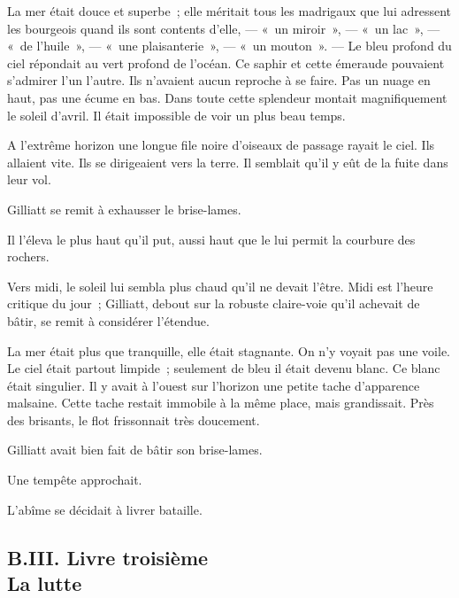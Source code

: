 \documentclass[french,twoside]{book} %
\begin{document}
La mer était douce et superbe ; elle méritait tous les madrigaux que lui adressent les bourgeois quand ils sont contents d’elle, — « un miroir », — « un lac », — « de l’huile », — « une plaisanterie », — « un mouton ». — Le bleu profond du ciel répondait au vert profond de l’océan. Ce saphir et cette émeraude pouvaient s’admirer l’un l’autre. Ils n’avaient aucun reproche à se faire. Pas un nuage en haut, pas une écume en bas. Dans toute cette splendeur montait magnifiquement le soleil d’avril. Il était impossible de voir un plus beau temps.\par
A l’extrême horizon une longue file noire d’oiseaux de passage rayait le ciel. Ils allaient vite. Ils se dirigeaient vers la terre. Il semblait qu’il y eût de la fuite dans leur vol.\par
Gilliatt se remit à exhausser le brise-lames.\par
Il l’éleva le plus haut qu’il put, aussi haut que le lui permit la courbure des rochers.\par
Vers midi, le soleil lui sembla plus chaud qu’il ne devait l’être. Midi est l’heure critique du jour ; Gilliatt, debout sur la robuste claire-voie qu’il achevait de bâtir, se remit à considérer l’étendue.\par
La mer était plus que tranquille, elle était stagnante. On n’y voyait pas une voile. Le ciel était  partout limpide ; seulement de bleu il était devenu blanc. Ce blanc était singulier. Il y avait à l’ouest sur l’horizon une petite tache d’apparence malsaine. Cette tache restait immobile à la même place, mais grandissait. Près des brisants, le flot frissonnait très doucement.\par
Gilliatt avait bien fait de bâtir son brise-lames.\par
Une tempête approchait.\par
L’abîme se décidait à livrer bataille.\par
  \subsection[{B.III. Livre troisième. La lutte}]{B.III. Livre troisième \\
La lutte}
\end{document}
